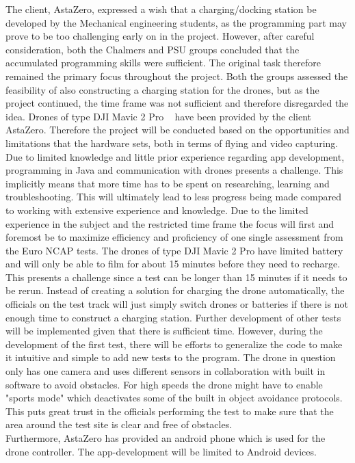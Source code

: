 \bigskip
The client, AstaZero, expressed a wish that a charging/docking station be developed by the Mechanical engineering students, as the programming part may prove to be too challenging early on in the project. However, after careful consideration, both the Chalmers and PSU groups concluded that the accumulated programming skills were sufficient. The original task therefore remained the primary focus throughout the project.
Both the groups assessed the feasibility of also constructing a charging station for the drones, but as the project continued, the time frame was not sufficient and therefore disregarded the idea. 
\bigskip
\newline
Drones of type DJI Mavic 2 Pro ~\cite{DJI2018MavicDJI} have been provided by the client AstaZero. Therefore the project will be conducted based on the opportunities and limitations that the hardware sets, both in terms of flying and video capturing. 
\bigskip
\newline
Due to limited knowledge and little prior experience regarding app development, programming in Java and communication with drones presents a challenge. This implicitly means that more time has to be spent on researching, learning and troubleshooting. This will ultimately lead to less progress being made compared to working with extensive experience and knowledge.
\bigskip
\newline
Due to the limited experience in the subject and the restricted time frame the focus will first and foremost be to maximize efficiency and proficiency of one single assessment from the Euro NCAP tests. 
\bigskip
\newline
The drones of type DJI Mavic 2 Pro have limited battery and will only be able to film for about 15 minutes before they need to recharge. This presents a challenge since a test can be longer than 15 minutes if it needs to be rerun. Instead of creating a solution for charging the drone automatically, the officials on the test track will just simply switch drones or batteries if there is not enough time to construct a charging station.
\bigskip
\newline
Further development of other tests will be implemented given that there is sufficient time. However, during the development of the first test, there will be efforts to generalize the code to make it intuitive and simple to add new tests to the program.
\bigskip
\newline
The drone in question only has one camera and uses different sensors in collaboration with built in software to avoid obstacles. For high speeds the drone might have to enable "sports mode" which deactivates some of the built in object avoidance protocols. This puts great trust in the officials performing the test to make sure that the area around the test site is clear and free of obstacles. 
\\
Furthermore, AstaZero has provided an android phone which is used for the drone controller. The app-development will be limited to Android devices.
